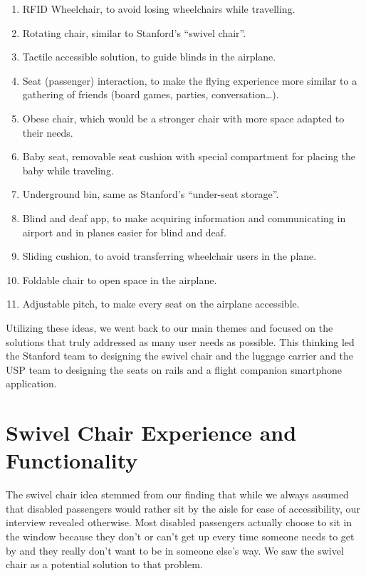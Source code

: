 \begin{enumerate}
 \item{RFID Wheelchair, to avoid losing wheelchairs while travelling.}
 \item{Rotating chair, similar to Stanford’s “swivel chair”.}
 \item{Tactile accessible solution, to guide blinds in the airplane.}
 \item{Seat (passenger) interaction, to make the flying experience more similar to a gathering of friends (board games, parties, conversation…).}
 \item{Obese chair, which would be a stronger chair with more space adapted to their needs.}
 \item{Baby seat, removable seat cushion with special compartment for placing the baby while traveling.}
 \item{Underground bin, same as Stanford’s “under-seat storage”.}
 \item{Blind and deaf app, to make acquiring information and communicating in airport and in planes easier for blind and deaf.}
 \item{Sliding cushion, to avoid transferring wheelchair users in the plane.}
 \item{Foldable chair to open space in the airplane.}
 \item{Adjustable pitch, to make every seat on the airplane accessible.}
\end{enumerate}
Utilizing these ideas, we went back to our main themes and focused on the solutions that truly addressed as many user needs as possible. This thinking led the Stanford team to designing the swivel chair and the luggage carrier and the USP team to designing the seats on rails and a flight companion smartphone application.

\section{Swivel Chair Experience and Functionality}
The swivel chair idea stemmed from our finding that while we always assumed that disabled passengers would rather sit by the aisle for ease of accessibility, our interview revealed otherwise. Most disabled passengers actually choose to sit in the window because they don’t or can’t get up every time someone needs to get by and they really don’t want to be in someone else’s way. We saw the swivel chair as a potential solution to that problem.

